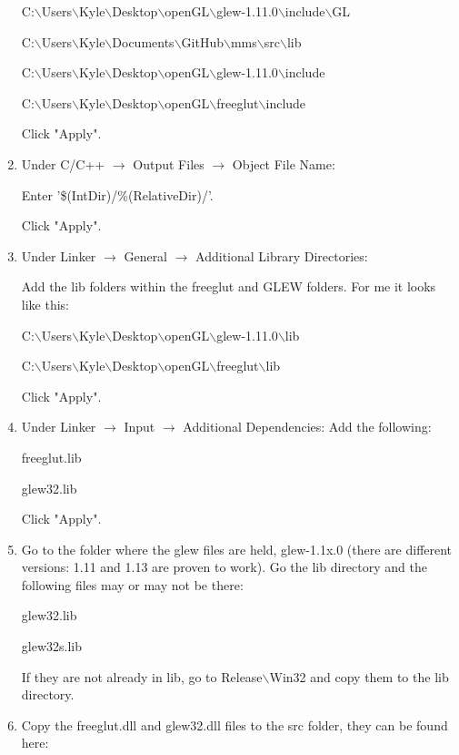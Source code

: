 \documentclass[12pt]{article}
\begin{document}
\begin{enumerate}
C:$\backslash$Users$\backslash$Kyle$\backslash$Desktop$\backslash$openGL$\backslash$glew-1.11.0$\backslash$include$\backslash$GL
    
C:$\backslash$Users$\backslash$Kyle$\backslash$Documents$\backslash$GitHub$\backslash$mms$\backslash$src$\backslash$lib
    
C:$\backslash$Users$\backslash$Kyle$\backslash$Desktop$\backslash$openGL$\backslash$glew-1.11.0$\backslash$include
    
C:$\backslash$Users$\backslash$Kyle$\backslash$Desktop$\backslash$openGL$\backslash$freeglut$\backslash$include
    
Click "Apply".
   
\item Under C/C++ $\rightarrow$ Output Files $\rightarrow$ Object File Name:

Enter '\$(IntDir)/\%(RelativeDir)/'.

Click "Apply".

\item Under Linker $\rightarrow$ General $\rightarrow$ Additional Library Directories:

Add the lib folders within the freeglut and GLEW folders.  For me it looks like this:
    
C:$\backslash$Users$\backslash$Kyle$\backslash$Desktop$\backslash$openGL$\backslash$glew-1.11.0$\backslash$lib

C:$\backslash$Users$\backslash$Kyle$\backslash$Desktop$\backslash$openGL$\backslash$freeglut$\backslash$lib
    
Click "Apply".
    
\item Under Linker $\rightarrow$ Input $\rightarrow$ Additional Dependencies: Add the following:

freeglut.lib
    
glew32.lib
    
Click "Apply".
    
\item Go to the folder where the glew files are held, glew-1.1x.0 (there are
different versions: 1.11 and 1.13 are proven to work).  Go the lib directory
and the following files may or may not be there:
    
glew32.lib
    
glew32s.lib
    
If they are not already in lib, go to Release$\backslash$Win32 and copy them to the lib directory.
    
\item Copy the freeglut.dll and glew32.dll files to the src folder, they can be found here:


\end{enumerate}
\end{document}
